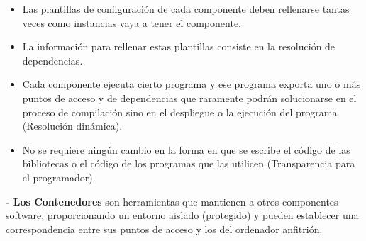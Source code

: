 \documentclass[12pt]{amsart}
\begin{document}
    \begin{itemize}
    
    \item  Las plantillas de configuración de cada componente deben rellenarse tantas veces como instancias vaya a tener el componente.
    
    \item  La información para rellenar estas plantillas consiste en la resolución de dependencias.
    
    \item  Cada componente ejecuta cierto programa y ese programa exporta uno o más puntos de acceso y de dependencias que raramente podrán solucionarse en el proceso de compilación sino en el despliegue o la ejecución del programa (Resolución dinámica).
    
    \item No se requiere ningún cambio en la forma en que se escribe el código de las bibliotecas o el código de los programas que las utilicen (Transparencia para el programador).
    
    \end{itemize}
       
    \vfill
    
    \newpage
    
    {\bf - Los Contenedores} son herramientas que mantienen a otros componentes software, proporcionando un entorno aislado (protegido) y pueden establecer una correspondencia entre sus puntos de acceso y los del ordenador anfitrión.
    
\end{document}
